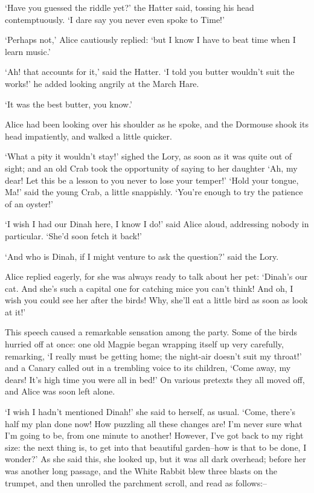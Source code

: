 \documentclass[statementpaper,twoside,openany]{memoir}
\begin{document}
`Have you guessed the riddle yet?' the Hatter said, tossing his head contemptuously. `I dare say you never even spoke to Time!'

`Perhaps not,' Alice cautiously replied: `but I know I have to beat time when I learn music.'

`Ah! that accounts for it,' said the Hatter. `I told you butter wouldn't suit the works!' he added looking angrily at the March Hare.

`It was the best butter, you know.'

Alice had been looking over his shoulder as he spoke, and the Dormouse shook its head impatiently, and walked a little quicker.

`What a pity it wouldn't stay!' sighed the Lory, as soon as it was quite out of sight; and an old Crab took the opportunity of saying to her daughter `Ah, my dear! Let this be a lesson to you never to lose your temper!' `Hold your tongue, Ma!' said the young Crab, a little snappishly. `You're enough to try the patience of an oyster!'

`I wish I had our Dinah here, I know I do!' said Alice aloud, addressing nobody in particular. `She'd soon fetch it back!'

`And who is Dinah, if I might venture to ask the question?' said the Lory.

Alice replied eagerly, for she was always ready to talk about her pet: `Dinah's our cat. And she's such a capital one for catching mice you can't think! And oh, I wish you could see her after the birds! Why, she'll eat a little bird as soon as look at it!'

This speech caused a remarkable sensation among the party. Some of the birds hurried off at once: one old Magpie began wrapping itself up very carefully, remarking, `I really must be getting home; the night-air doesn't suit my throat!' and a Canary called out in a trembling voice to its children, `Come away, my dears! It's high time you were all in bed!' On various pretexts they all moved off, and Alice was soon left alone.

`I wish I hadn't mentioned Dinah!' she said to herself, as usual. `Come, there's half my plan done now! How puzzling all these changes are! I'm never sure what I'm going to be, from one minute to another! However, I've got back to my right size: the next thing is, to get into that beautiful garden--how is that to be done, I wonder?' As she said this, she looked up, but it was all dark overhead; before her was another long passage, and the White Rabbit blew three blasts on the trumpet, and then unrolled the parchment scroll, and read as follows:--
\end{document}
